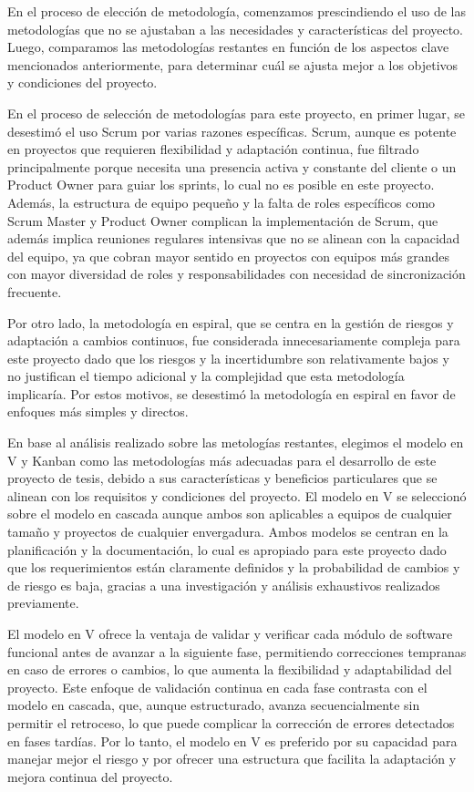 En el proceso de elección de metodología, comenzamos prescindiendo el uso de las metodologías que no se ajustaban a las necesidades y características del proyecto. Luego, comparamos las metodologías restantes en función de los aspectos clave mencionados anteriormente, para determinar cuál se ajusta mejor a los objetivos y condiciones del proyecto.

En el proceso de selección de metodologías para este proyecto, en primer lugar, se desestimó el uso Scrum por varias razones específicas. Scrum, aunque es potente en proyectos que requieren flexibilidad y adaptación continua, fue filtrado principalmente porque necesita una presencia activa y constante del cliente o un Product Owner para guiar los sprints, lo cual no es posible en este proyecto. Además, la estructura de equipo pequeño y la falta de roles específicos como Scrum Master y Product Owner complican la implementación de Scrum, que además implica reuniones regulares intensivas que no se alinean con la capacidad del equipo, ya que cobran mayor sentido en proyectos con equipos más grandes con mayor diversidad de roles y responsabilidades con necesidad de sincronización frecuente.

Por otro lado, la metodología en espiral, que se centra en la gestión de riesgos y adaptación a cambios continuos, fue considerada innecesariamente compleja para este proyecto dado que los riesgos y la incertidumbre son relativamente bajos y no justifican el tiempo adicional y la complejidad que esta metodología implicaría. Por estos motivos, se desestimó la metodología en espiral en favor de enfoques más simples y directos.

En base al análisis realizado sobre las metologías restantes, elegimos el modelo en V y Kanban como las metodologías más adecuadas para el desarrollo de este proyecto de tesis, debido a sus características y beneficios particulares que se alinean con los requisitos y condiciones del proyecto. El modelo en V se seleccionó sobre el modelo en cascada aunque ambos son aplicables a equipos de cualquier tamaño y proyectos de cualquier envergadura. Ambos modelos se centran en la planificación y la documentación, lo cual es apropiado para este proyecto dado que los requerimientos están claramente definidos y la probabilidad de cambios y de riesgo es baja, gracias a una investigación y análisis exhaustivos realizados previamente.

El modelo en V ofrece la ventaja de validar y verificar cada módulo de software funcional antes de avanzar a la siguiente fase, permitiendo correcciones tempranas en caso de errores o cambios, lo que aumenta la flexibilidad y adaptabilidad del proyecto. Este enfoque de validación continua en cada fase contrasta con el modelo en cascada, que, aunque estructurado, avanza secuencialmente sin permitir el retroceso, lo que puede complicar la corrección de errores detectados en fases tardías. Por lo tanto, el modelo en V es preferido por su capacidad para manejar mejor el riesgo y por ofrecer una estructura que facilita la adaptación y mejora continua del proyecto.

